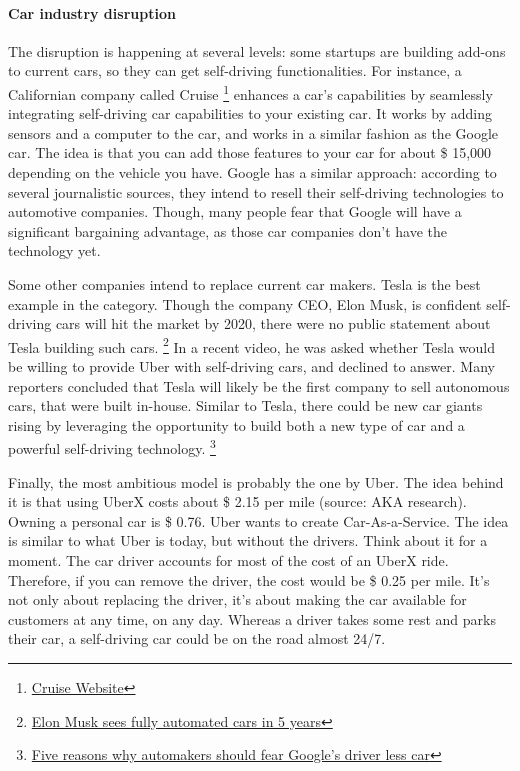 \documentclass[12pt]{article}
\begin{document}
\smallskip

\paragraph{Car industry disruption}

The disruption is happening at several levels: some startups are building add-ons
to current cars, so they can get self-driving functionalities. For instance,
a Californian company called Cruise
\footnote{\href{http://www.getcruise.com}{Cruise Website}}
enhances a car's capabilities by seamlessly integrating self-driving car
capabilities to your existing car. It works by adding sensors and a computer to
the car, and works in a similar fashion as the Google car. The idea is that you
can add those features to your car for about \$ 15,000 depending on the vehicle
you have. Google has a similar approach: according to several journalistic
sources, they intend to resell their self-driving technologies to automotive
companies. Though, many people fear that Google will have a significant
bargaining advantage, as those car companies don't have the technology yet.

Some other companies intend to replace current car makers. Tesla is the best
example in the category. Though the company CEO, Elon Musk, is confident
self-driving cars will hit the market by 2020, there were no public statement
about Tesla building such cars. \footnote{\href{http://my.teslamotors.com/fr_CH/forum/forums/tesla\%E2\%80\%99s-musk-sees-fully-autonomous-car-ready-5-years}
{Elon Musk sees fully automated cars in 5 years}} In a recent video, he was asked whether Tesla
would be willing to provide Uber with self-driving cars, and declined to answer.
Many reporters concluded that Tesla will likely be the first company to sell
autonomous cars, that were built in-house. Similar to Tesla, there could be new
car giants rising by leveraging the opportunity to build both a new type of car
and a powerful self-driving technology. \footnote{\href{http://www.forbes.com/sites/chunkamui/2014/08/04/5-reasons-why-automakers-should-fear-googles-driverless-car/}
{Five reasons why automakers should fear Google's driver less car}}

Finally, the most ambitious model is probably the one by Uber. The idea behind
it is that using UberX costs about \$ 2.15 per mile (source: AKA research).
Owning a personal car is \$ 0.76. Uber wants to create Car-As-a-Service.
The idea is similar to what Uber is today, but without the drivers. Think about
it for a moment. The car driver accounts for most of the cost of an UberX ride.
Therefore, if you can remove the driver, the cost would be \$ 0.25 per mile.
It's not only about replacing the driver, it's about making the car available
for customers at any time, on any day. Whereas a driver takes some rest and
parks their car, a self-driving car could be on the road almost 24/7.
\end{document}
